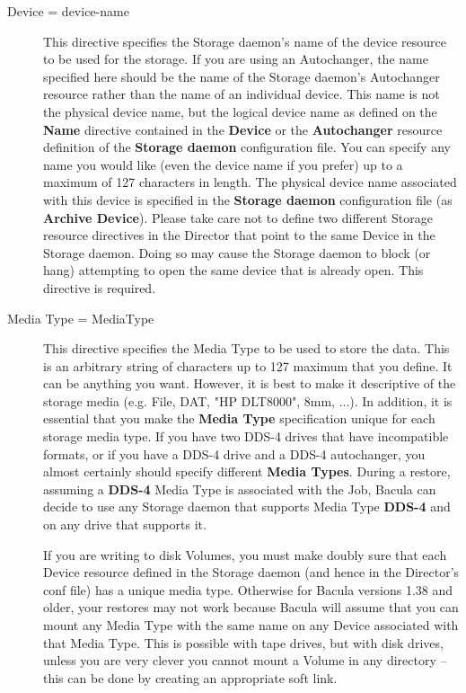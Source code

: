 \begin{description}
\item [Device = \lt{}device-name\gt{}]
   This directive specifies the Storage daemon's name of the device
   resource to be used for the storage.  If you are using an Autochanger,
   the name specified here should be the name of the Storage daemon's
   Autochanger resource rather than the name of an individual device.  This
   name is not the physical device name, but the logical device name as
   defined on the {\bf Name} directive contained in the {\bf Device} or the
   {\bf Autochanger} resource definition of the {\bf Storage daemon}
   configuration file.  You can specify any name you would like (even the
   device name if you prefer) up to a maximum of 127 characters in length.
   The physical device name associated with this device is specified in the
   {\bf Storage daemon} configuration file (as {\bf Archive Device}).
   Please take care not to define two different Storage resource directives
   in the Director that point to the same Device in the Storage daemon.
   Doing so may cause the Storage daemon to block (or hang) attempting to
   open the same device that is already open.  This directive is required.

\label{MediaType}
\item [Media Type = \lt{}MediaType\gt{}]
   This directive specifies the Media Type to be used to store the data.
   This is an arbitrary string of characters up to 127 maximum that you
   define.  It can be anything you want.  However, it is best to make it
   descriptive of the storage media (e.g.  File, DAT, "HP DLT8000", 8mm,
   ...).  In addition, it is essential that you make the {\bf Media Type}
   specification unique for each storage media type.  If you have two DDS-4
   drives that have incompatible formats, or if you have a DDS-4 drive and
   a DDS-4 autochanger, you almost certainly should specify different {\bf
   Media Types}.  During a restore, assuming a {\bf DDS-4} Media Type is
   associated with the Job, Bacula can decide to use any Storage daemon
   that supports Media Type {\bf DDS-4} and on any drive that supports it.

   If you are writing to disk Volumes, you must make doubly sure that each
   Device resource defined in the Storage daemon (and hence in the
   Director's conf file) has a unique media type.  Otherwise for Bacula
   versions 1.38 and older, your restores may not work because Bacula
   will assume that you can mount any Media Type with the same name on
   any Device associated with that Media Type. This is possible with
   tape drives, but with disk drives, unless you are very clever you
   cannot mount a Volume in any directory -- this can be done by creating
   an appropriate soft link.


\end{description}
